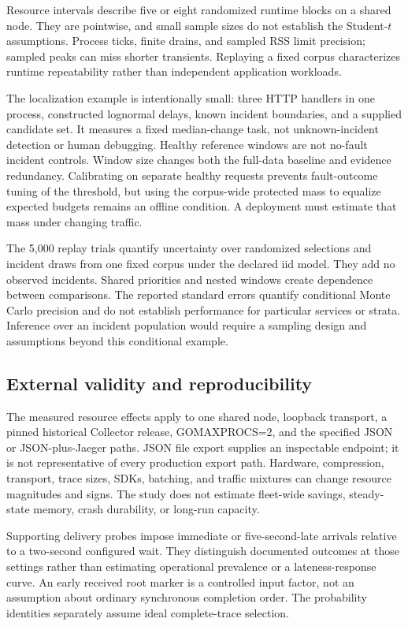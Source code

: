 Resource intervals describe five or eight randomized runtime blocks on a shared node. They are pointwise, and small sample sizes do not establish the Student-$t$ assumptions. Process ticks, finite drains, and sampled RSS limit precision; sampled peaks can miss shorter transients. Replaying a fixed corpus characterizes runtime repeatability rather than independent application workloads.

The localization example is intentionally small: three HTTP handlers in one process, constructed lognormal delays, known incident boundaries, and a supplied candidate set. It measures a fixed median-change task, not unknown-incident detection or human debugging. Healthy reference windows are not no-fault incident controls. Window size changes both the full-data baseline and evidence redundancy. Calibrating on separate healthy requests prevents fault-outcome tuning of the threshold, but using the corpus-wide protected mass to equalize expected budgets remains an offline condition. A deployment must estimate that mass under changing traffic.

The 5,000 replay trials quantify uncertainty over randomized selections and incident draws from one fixed corpus under the declared iid model. They add no observed incidents. Shared priorities and nested windows create dependence between comparisons. The reported standard errors quantify conditional Monte Carlo precision and do not establish performance for particular services or strata. Inference over an incident population would require a sampling design and assumptions beyond this conditional example.

\subsection{External validity and reproducibility}
The measured resource effects apply to one shared node, loopback transport, a pinned historical Collector release, GOMAXPROCS=2, and the specified JSON or JSON-plus-Jaeger paths. JSON file export supplies an inspectable endpoint; it is not representative of every production export path. Hardware, compression, transport, trace sizes, SDKs, batching, and traffic mixtures can change resource magnitudes and signs. The study does not estimate fleet-wide savings, steady-state memory, crash durability, or long-run capacity.

Supporting delivery probes impose immediate or five-second-late arrivals relative to a two-second configured wait. They distinguish documented outcomes at those settings rather than estimating operational prevalence or a lateness-response curve. An early received root marker is a controlled input factor, not an assumption about ordinary synchronous completion order. The probability identities separately assume ideal complete-trace selection.

